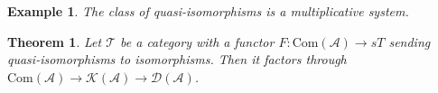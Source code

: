 \documentclass[10pt]{article}
\numberwithin{equation}{section}
\newtheorem{theorem}{Theorem} [section]
\newtheorem{example}{Example}[section]
\newcommand{\cK}[0]{\mathcal{K}}
\newcommand{\cD}[0]{\mathcal{D}}
\newcommand{\sA}[0]{\mathscr{A}}
\newcommand{\sT}[0]{\mathscr{T}}
\newcommand{\Com}[0]{\mathrm{Com}}
\begin{document}

\begin{example}
    The class of quasi-isomorphisms is a multiplicative system.  
    \begin{center}
    \end{center}
\end{example}

\begin{theorem}
    Let $\sT$ be a category with a functor $F:\Com(\sA)\to sT$ sending quasi-isomorphisms to isomorphisms. Then it factors through $\Com(\sA)\to \cK(\sA)\to\cD(\sA)$.
    \begin{center}
    \end{center}
\end{theorem}
\end{document}
